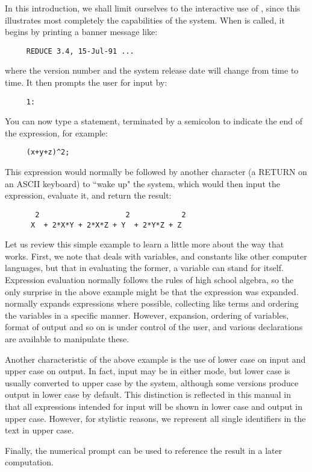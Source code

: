 In this introduction, we shall limit ourselves to the interactive use of
{\REDUCE}, since this illustrates most completely the capabilities of the
system. When {\REDUCE} is called, it begins by printing a banner message
like:
\begin{verbatim}
     REDUCE 3.4, 15-Jul-91 ...
\end{verbatim}
where the version number and the system release date will change from time
to time. It then prompts the user for input by:
\begin{verbatim}
     1:
\end{verbatim}
You can now type a {\REDUCE} statement, terminated by a semicolon to indicate
the end of the expression, for example:
\begin{verbatim}
     (x+y+z)^2;
\end{verbatim}
This expression would normally be followed by another character (a RETURN
on an ASCII keyboard) to ``wake up" the system, which would then input the
expression, evaluate it, and return the result:
\begin{verbatim}
       2                    2            2
      X  + 2*X*Y + 2*X*Z + Y  + 2*Y*Z + Z
\end{verbatim}
Let us review this simple example to learn a little more about the way that
{\REDUCE} works. First, we note that {\REDUCE} deals with variables, and
constants like other computer languages, but that in evaluating the former,
a variable can stand for itself. Expression evaluation normally follows
the rules of high school algebra, so the only surprise in the above example
might be that the expression was expanded. {\REDUCE} normally expands
expressions where possible, collecting like terms and ordering the
variables in a specific manner. However, expansion, ordering of variables,
format of output and so on is under control of the user, and various
declarations are available to manipulate these.

Another characteristic of the above example is the use of lower case on
input and upper case on output.  In fact, input may be in either mode, but
lower case is usually converted to upper case by the system, although some
versions produce output in lower case by default.  This distinction is
reflected in this manual in that all expressions intended for input will
be shown in lower case and output in upper case.  However, for stylistic
reasons, we represent all single identifiers in the text in upper case.

Finally, the numerical prompt can be used to reference the result in a
later computation.

